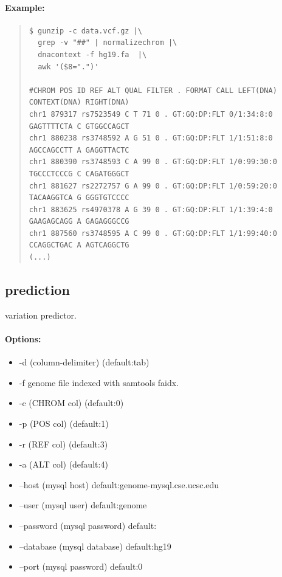 \documentclass[12pt]{article}
\begin{document}
\paragraph{Example:}

\begin{quote}
\begin{verbatim}
$ gunzip -c data.vcf.gz |\
  grep -v "##" | normalizechrom |\
  dnacontext -f hg19.fa  |\
  awk '($8=".")'

#CHROM POS ID REF ALT QUAL FILTER . FORMAT CALL LEFT(DNA) CONTEXT(DNA) RIGHT(DNA)
chr1 879317 rs7523549 C T 71 0 . GT:GQ:DP:FLT 0/1:34:8:0 GAGTTTTCTA C GTGGCCAGCT
chr1 880238 rs3748592 A G 51 0 . GT:GQ:DP:FLT 1/1:51:8:0 AGCCAGCCTT A GAGGTTACTC
chr1 880390 rs3748593 C A 99 0 . GT:GQ:DP:FLT 1/0:99:30:0 TGCCCTCCCG C CAGATGGGCT
chr1 881627 rs2272757 G A 99 0 . GT:GQ:DP:FLT 1/0:59:20:0 TACAAGGTCA G GGGTGTCCCC
chr1 883625 rs4970378 A G 39 0 . GT:GQ:DP:FLT 1/1:39:4:0 GAAGAGCAGG A GAGAGGGCCG
chr1 887560 rs3748595 A C 99 0 . GT:GQ:DP:FLT 1/1:99:40:0 CCAGGCTGAC A AGTCAGGCTG
(...)
\end{verbatim}
\end{quote}

\subsection{prediction}
variation predictor.
\paragraph{Options:}
\begin{itemize}
\item-d (column-delimiter) (default:tab)
\item-f genome file indexed with samtools faidx.
\item-c (CHROM col) (default:0)
\item-p (POS col) (default:1)
\item-r (REF col) (default:3)
\item-a (ALT col) (default:4)
\item--host (mysql host) default:genome-mysql.cse.ucsc.edu
\item--user (mysql user) default:genome
\item--password (mysql password) default:
\item--database (mysql database) default:hg19
\item--port (mysql password) default:0
\end{itemize}
\end{document}

